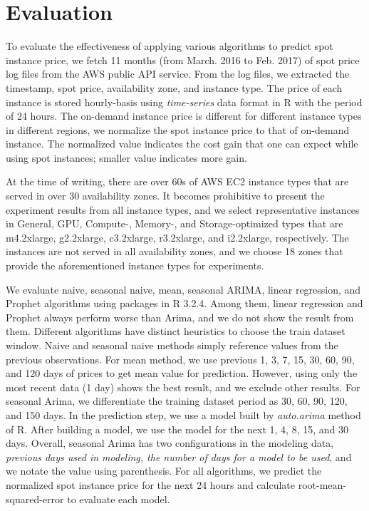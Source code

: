 \documentclass[graybox]{svmult}
\begin{document}
\section{Evaluation}
To evaluate the effectiveness of applying various algorithms to predict spot instance price, we fetch 11 months (from March. 2016 to Feb. 2017) of spot price log files from the AWS public API service. From the log files, we extracted the timestamp, spot price, availability zone, and instance type. The price of each instance is stored hourly-basis using \emph{time-series} data format in R with the period of 24 hours. The on-demand instance price is different for different instance types in different regions, we normalize the spot instance price to that of on-demand instance. The normalized value indicates the cost gain that one can expect while using spot instances; smaller value indicates more gain.

At the time of writing, there are over 60s of AWS EC2 instance types that are served in over 30 availability zones. It becomes prohibitive to present the experiment results from all instance types, and we select representative instances in General, GPU, Compute-, Memory-, and Storage-optimized types that are m4.2xlarge, g2.2xlarge, c3.2xlarge, r3.2xlarge, and i2.2xlarge, respectively. The instances are not served in all availability zones, and we choose 18 zones that provide the aforementioned instance types for experiments.

We evaluate naive, seasonal naive, mean, seasonal ARIMA, linear regression, and Prophet algorithms using packages in R 3.2.4. Among them, linear regression and Prophet always perform worse than Arima, and we do not show the result from them. Different algorithms have distinct heuristics to choose the train dataset window. Naive and seasonal naive methods simply reference values from the previous observations. For mean method, we use previous 1, 3, 7, 15, 30, 60, 90, and 120 days of prices to get mean value for prediction. However, using only the most recent data (1 day) shows the best result, and we exclude other results. For seasonal Arima, we differentiate the training dataset period as 30, 60, 90, 120, and 150 days. In the prediction step, we use a model built by \textit{auto.arima} method of R. After building a model, we use the model for the next 1, 4, 8, 15, and 30 days. Overall, seasonal Arima has two configurations in the modeling data, \emph{previous days used in modeling, the number of days for a model to be used}, and we notate the value using parenthesis. For all algorithms, we predict the normalized spot instance price for the next 24 hours and calculate root-mean-squared-error to evaluate each model.
\end{document}
